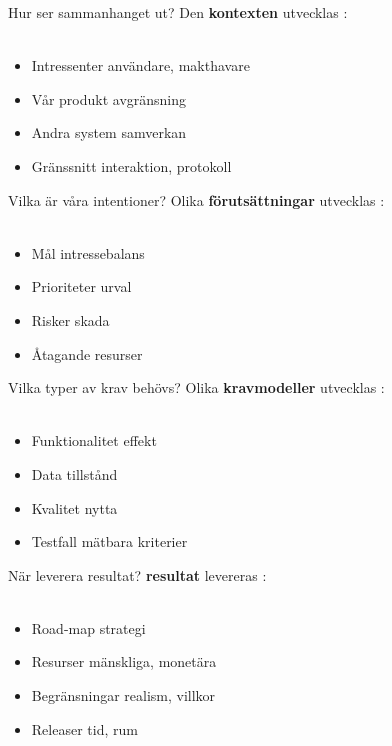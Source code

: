 \documentclass{simpleslides}
\begin{document}
\begin{Slide}{Hur ser sammanhanget ut?}
Den  \textbf{kontexten} utvecklas : \\~
\begin{itemize}
\item Intressenter \hfill användare, makthavare
\item Vår produkt  \hfill avgränsning
\item Andra system \hfill samverkan
\item Gränssnitt \hfill interaktion, protokoll
\end{itemize}
\end{Slide}


\begin{Slide}{Vilka är våra intentioner?}
Olika  \textbf{förutsättningar} utvecklas : \\~
\begin{itemize}
\item Mål \hfill intressebalans
\item Prioriteter  \hfill urval
\item Risker \hfill skada
\item Åtagande \hfill resurser
\end{itemize}
\end{Slide}

\begin{Slide}{Vilka typer av krav behövs?}
Olika  \textbf{kravmodeller} utvecklas : \\~
\begin{itemize}
\item Funktionalitet \hfill effekt
\item Data  \hfill tillstånd
\item Kvalitet \hfill nytta
\item Testfall \hfill mätbara kriterier
\end{itemize}
\end{Slide}


\begin{Slide}{När leverera resultat?}
 \textbf{resultat} levereras : \\~
\begin{itemize}
\item Road-map \hfill strategi
\item Resurser  \hfill mänskliga, monetära
\item Begränsningar \hfill realism, villkor
\item Releaser \hfill tid, rum
\end{itemize}
\end{Slide}
\end{document}
